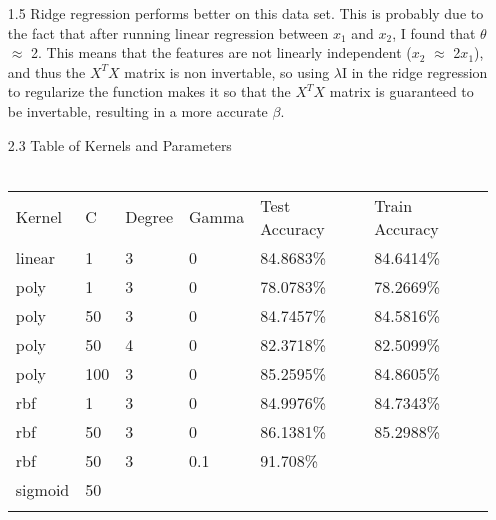 \documentclass{article}
\begin{document}
\begin{enumerate}
\item[1.5]
Ridge regression performs better on this data set. This is probably due to the fact that after running linear regression between $x_1$ and $x_2$, I found that $\theta$ $\approx$ 2. This means that the features are not linearly independent ($x_2$ $\approx$ 2$x_1$), and thus the $X^TX$ matrix is non invertable, so using $\lambda$I in the ridge regression to regularize the function makes it so that the $X^TX$ matrix is guaranteed to be invertable, resulting in a more accurate $\beta$.
\\
\item[2.3]
Table of Kernels and Parameters\\\\
\begin{tabular}{llllll}
Kernel  & C   & Degree & Gamma & Test Accuracy & Train Accuracy \\
linear  & 1   & 3      & 0     & 84.8683\%     & 84.6414\%      \\
poly    & 1   & 3      & 0     & 78.0783\%     & 78.2669\%      \\
poly    & 50  & 3      & 0     & 84.7457\%     & 84.5816\%      \\
poly    & 50  & 4      & 0     & 82.3718\%     & 82.5099\%      \\
poly    & 100 & 3      & 0     & 85.2595\%     & 84.8605\%      \\
rbf     & 1   & 3      & 0     & 84.9976\%     & 84.7343\%      \\
rbf     & 50  & 3      & 0     & 86.1381\%     & 85.2988\%      \\
rbf     & 50  & 3      & 0.1   & 91.708\%      &                \\
sigmoid & 50  &        &       &               &                \\
        &     &        &       &               &               
\end{tabular}


\end{enumerate}
\end{document}

